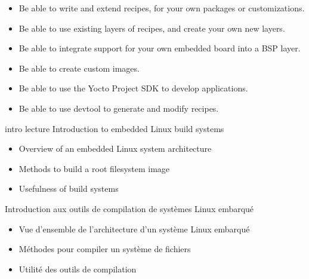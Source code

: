 {{\begin{itemize}
    \item Be able to write and extend recipes, for your own packages or
      customizations.
    \item Be able to use existing layers of recipes, and create your own
      new layers.
    \item Be able to integrate support for your own embedded board into
      a BSP layer.
    \item Be able to create custom images.
    \item Be able to use the Yocto Project SDK to develop applications.
    \item Be able to use devtool to generate and modify recipes.
    \end{itemize}
  }
}

\def \trainingprerequisites{
  \begin{itemize}
    \prerequisitecommandline
    \prerequisiteembeddedlinux
    \prerequisiteenglish
  \end{itemize}
}



\def \onsitelecturetimeratio{40}
\def \onsitelabtimeratio{60}


{intro}
{lecture}
{Introduction to embedded Linux build systems}
{
  \begin{itemize}
  \item Overview of an embedded Linux system architecture
  \item Methods to build a root filesystem image
  \item Usefulness of build systems
  \end{itemize}
}
{Introduction aux outils de compilation de systèmes Linux embarqué}
{
  \begin{itemize}
  \item Vue d'ensemble de l'architecture d'un système Linux embarqué
  \item Méthodes pour compiler un système de fichiers
  \item Utilité des outils de compilation
  \end{itemize}
}

